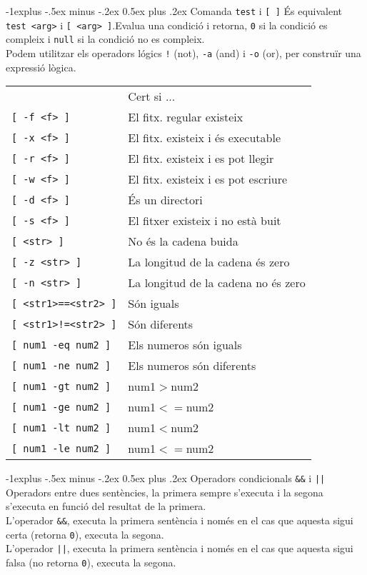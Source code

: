 \documentclass[10pt,landscape]{article}
\makeatletter
\renewcommand{\subsection}{\@startsection{subsection}{2}{0mm}%
                                {-1explus -.5ex minus -.2ex}%
                                {0.5ex plus .2ex}%
                                {\normalfont\normalsize\bfseries}}
\makeatother
\begin{document}
\begin{multicols}{3}
\subsection{Comanda \texttt{test} i \texttt{[ ]}}
És equivalent \verb!test <arg>! i \verb![ <arg> ]!.Evalua una condició i retorna, \texttt{0} si la condició es compleix i \texttt{null} si la condició no es compleix.\\ 
Podem utilitzar els operadors lógics \texttt{!} (not), \texttt{-a} (and) i \texttt{-o} (or), per construïr una expressió lògica.\\
\begin{tabular}{@{}ll@{}}
  & Cert si ...\\
  \verb![ -f <f> ]! & El fitx. regular existeix\\
  \verb![ -x <f> ]! & El fitx. existeix i és executable\\
  \verb![ -r <f> ]! & El fitx. existeix i es pot llegir\\
  \verb![ -w <f> ]! & El fitx. existeix i es pot escriure\\
  \verb![ -d <f> ]! & És un directori\\
  \verb![ -s <f> ]! & El fitxer existeix i no està buit\\
  \verb![ <str> ]! & No és la cadena buida \\
  \verb![ -z <str> ]! & La longitud de la cadena és zero\\
  \verb![ -n <str> ]! & La longitud de la cadena no és zero\\
  \verb![ <str1>==<str2> ]! & Són iguals \\
  \verb|[ <str1>!=<str2> ]| & Són diferents \\
  \verb![ num1 -eq num2 ]! & Els numeros són iguals\\
  \verb![ num1 -ne num2 ]! & Els numeros són diferents\\
  \verb![ num1 -gt num2 ]! & num1$>$num2\\
  \verb![ num1 -ge num2 ]! & num1$<=$num2\\
  \verb![ num1 -lt num2 ]! & num1$<$num2\\
  \verb![ num1 -le num2 ]! & num1$<=$num2\\
\end{tabular}

\subsection{Operadors condicionals \texttt{\&\&} i \texttt{||}}
Operadors entre dues sentències, la primera sempre s'executa i la segona s'executa en funció del resultat de la primera.\\
L'operador \texttt{\&\&}, executa la primera sentència i només en el cas que aquesta sigui certa (retorna \verb!0!), executa la segona.\\
L'operador \texttt{||}, executa la primera sentència i només en el cas que aquesta sigui falsa (no retorna \verb!0!), executa la segona.\\


\end{multicols}
\end{document}

